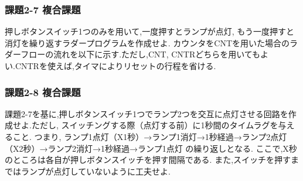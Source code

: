 \subsubsection*{課題2-7 複合課題}
押しボタンスイッチ1つのみを用いて,一度押すとランプが点灯,
もう一度押すと消灯を繰り返すラダープログラムを作成せよ.
カウンタをCNTを用いた場合のラダーフローの流れを以下に示す.ただし,CNT,
CNTRどちらを用いてもよい.CNTRを使えば,タイマによりリセットの行程を省ける.

\subsubsection*{課題2-8 複合課題}
課題2-7を基に,押しボタンスイッチ1つでランプ2つを交互に点灯させる回路を作成せよ.ただし,
スイッチングする際（点灯する前）に1秒間のタイムラグを与えること.
つまり,
ランプ1点灯（X1秒）→ランプ1消灯→1秒経過→ランプ2点灯（X2秒）→ランプ2消灯→1秒経過→ランプ1点灯
の繰り返しとなる.
ここで,X秒のところは各自が押しボタンスイッチを押す間隔である.
また,スイッチを押すまではランプが点灯していないように工夫せよ.
